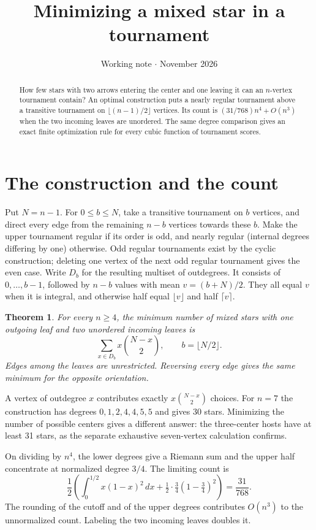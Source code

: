 \documentclass[11pt]{article}
\title{\bfseries Minimizing a mixed star in a tournament}
\author{}
\date{Working note \(\cdot\) November 2026}
\newtheorem{theorem}{Theorem}
\newcommand{\fl}[1]{\lfloor #1\rfloor}
\newcommand{\ce}[1]{\lceil #1\rceil}
\begin{document}
\maketitle
\begin{abstract}\noindent
How few stars with two arrows entering the center and one leaving it can
an \(n\)-vertex tournament contain? An optimal construction puts a nearly
regular tournament above a transitive tournament on
\(\fl{(n-1)/2}\) vertices. Its count is
\((31/768)n^4+O(n^3)\) when the two incoming leaves are unordered.
The same degree comparison gives an exact finite optimization rule for
every cubic function of tournament scores.
\end{abstract}

\section*{The construction and the count}
Put \(N=n-1\). For \(0\le b\le N\), take a transitive tournament on \(b\)
vertices, and direct every edge from the remaining \(n-b\) vertices
towards these \(b\). Make the upper tournament regular if its order is
odd, and nearly regular (internal degrees differing by one) otherwise.
Odd regular tournaments exist by the cyclic construction; deleting one
vertex of the next odd regular tournament gives the even case.
Write \(D_b\) for the resulting multiset of outdegrees. It consists of
\(0,\ldots,b-1\), followed by \(n-b\) values with mean \(v=(b+N)/2\).
They all equal \(v\) when it is integral, and otherwise half equal
\(\fl v\) and half \(\ce v\).

\begin{theorem}\label{th:star}
For every \(n\ge4\), the minimum number of mixed stars with one outgoing
leaf and two unordered incoming leaves is
\[
   \sum_{x\in D_b}x\binom{N-x}{2},\qquad b=\fl{N/2}.
\]
Edges among the leaves are unrestricted. Reversing every edge gives the
same minimum for the opposite orientation.
\end{theorem}

A vertex of outdegree \(x\) contributes exactly \(x\binom{N-x}{2}\)
choices. For \(n=7\) the construction has degrees \(0,1,2,4,4,5,5\)
and gives 30 stars. Minimizing the number of possible centers gives a
different answer: the three-center hosts have at least 31 stars, as the
separate exhaustive seven-vertex calculation confirms.

On dividing by \(n^4\), the lower degrees give a Riemann sum and the
upper half concentrate at normalized degree \(3/4\). The limiting count is
\[
 \frac12\left(\int_0^{1/2}x(1-x)^2\,dx
       +\tfrac12\cdot\tfrac34(1-\tfrac34)^2\right)=\frac{31}{768}.
\]
The rounding of the cutoff and of the upper degrees contributes \(O(n^3)\)
to the unnormalized count. Labeling the two incoming leaves doubles it.
\end{document}
